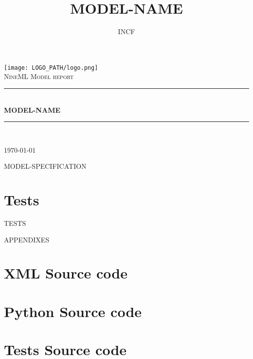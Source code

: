 \documentclass[a4paper]{article}
\title{MODEL-NAME}
\author{INCF}
\newcommand{\HRule}{\rule{\linewidth}{0.2mm}}
\begin{document}
\begin{titlepage}
\begin{center}

\vspace*{5cm}

\texttt{[image: LOGO\_PATH/logo.png]} \\[1cm]    

\textsc{\Large NineML Model report}\\[0.5cm]

\HRule \\[0.4cm]
{ \huge \bfseries MODEL-NAME}\\[0.4cm]

\HRule \\[1.5cm]

\vfill

{\large \today}

\end{center}
\end{titlepage}
\newpage

\tableofcontents
\newpage

MODEL-SPECIFICATION
\newpage

\section{Tests}

TESTS
\newpage

\appendix

APPENDIXES

\section{XML Source code}

\section{Python Source code}

\section{Tests Source code}

\vfill
\end{document}
